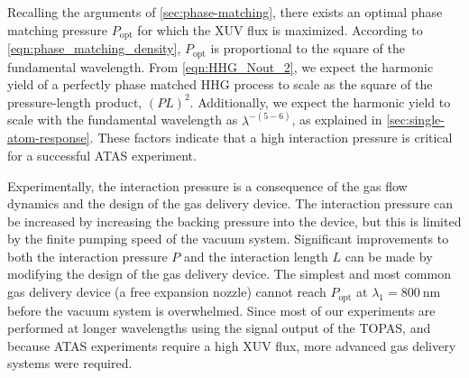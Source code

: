 Recalling the arguments of \cref{sec:phase-matching}, there exists an optimal phase matching pressure $P_{\textrm{opt}}$ for which the XUV flux is maximized. According to \cref{eqn:phase_matching_density}, $P_{\textrm{opt}}$ is proportional to the square of the fundamental wavelength. From \cref{eqn:HHG_Nout_2}, we expect the harmonic yield of a perfectly phase matched HHG process to scale as the square of the pressure-length product, $(PL)^2$. Additionally, we expect the harmonic yield to scale with the fundamental wavelength as $\lambda^{-(5-6)}$, as explained in \cref{sec:single-atom-response}. These factors indicate that a high interaction pressure is critical for a successful ATAS experiment.

Experimentally, the interaction pressure is a consequence of the gas flow dynamics and the design of the gas delivery device. The interaction pressure can be increased by increasing the backing pressure into the device, but this is limited by the finite pumping speed of the vacuum system. Significant improvements to both the interaction pressure $P$ and the interaction length $L$ can be made by modifying the design of the gas delivery device. The simplest and most common gas delivery device (a free expansion nozzle) cannot reach $P_{\textrm{opt}}$ at $\lambda_1 = 800 \ \textrm{nm}$ before the vacuum system is overwhelmed. Since most of our experiments are performed at longer wavelengths using the signal output of the TOPAS, and because ATAS experiments require a high XUV flux, more advanced gas delivery systems were required.



